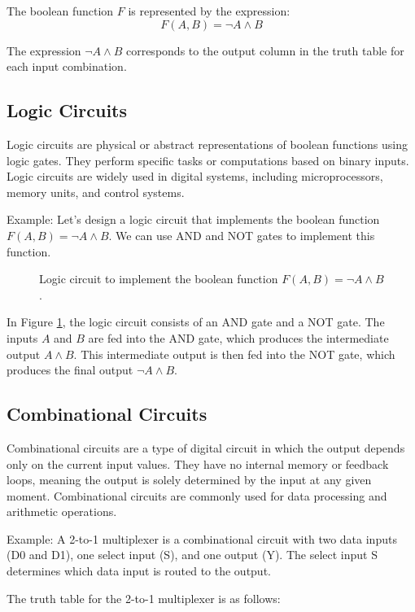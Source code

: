\documentclass{article}
\begin{document}
The boolean function $F$ is represented by the expression:
\[ F(A, B) = \lnot A \land B \]

The expression $\lnot A \land B$ corresponds to the output column in the truth table for each input combination.

\subsection{Logic Circuits}

Logic circuits are physical or abstract representations of boolean functions using logic gates. They perform specific tasks or computations based on binary inputs. Logic circuits are widely used in digital systems, including microprocessors, memory units, and control systems.

Example: Let's design a logic circuit that implements the boolean function $F(A, B) = \lnot A \land B$. We can use AND and NOT gates to implement this function.

\begin{figure}[h]
  \centering
  \caption{Logic circuit to implement the boolean function $F(A, B) = \lnot A \land B$.}
  \label{fig:logic_circuit_example}
\end{figure}

In Figure \ref{fig:logic_circuit_example}, the logic circuit consists of an AND gate and a NOT gate. The inputs $A$ and $B$ are fed into the AND gate, which produces the intermediate output $A \land B$. This intermediate output is then fed into the NOT gate, which produces the final output $\lnot A \land B$.

\subsection{Combinational Circuits}

Combinational circuits are a type of digital circuit in which the output depends only on the current input values. They have no internal memory or feedback loops, meaning the output is solely determined by the input at any given moment. Combinational circuits are commonly used for data processing and arithmetic operations.

Example: A 2-to-1 multiplexer is a combinational circuit with two data inputs (D0 and D1), one select input (S), and one output (Y). The select input S determines which data input is routed to the output.

The truth table for the 2-to-1 multiplexer is as follows:
\end{document}

